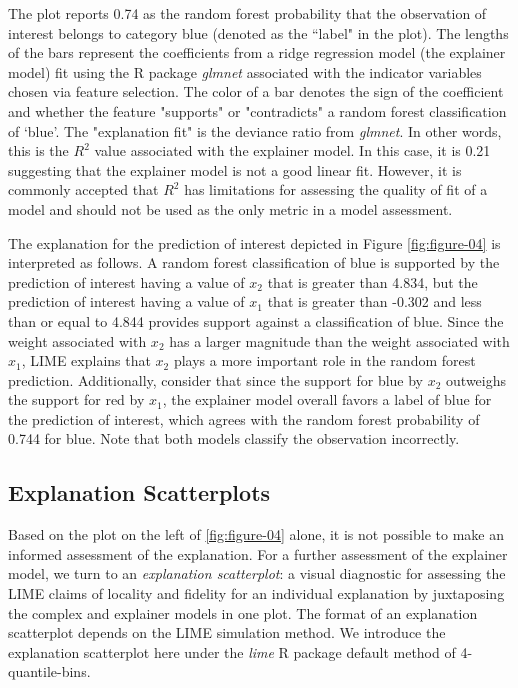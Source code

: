 \documentclass[AMS,STIX2COL]{WileyNJD-v2}\usepackage[]{graphicx}\usepackage[]{color}
\begin{document}
The plot reports 0.74 as  the random forest  probability  that the observation of interest belongs to category blue (denoted as the ``label" in the plot). The lengths of the bars represent the  coefficients from a ridge regression model (the explainer model) fit using the R package \emph{glmnet} \citep{simon:2011} associated with the indicator variables chosen via feature selection. The color of a  bar denotes the sign of the coefficient and whether the feature "supports" or "contradicts" a random forest classification of `blue'. The "explanation fit" is the deviance ratio from  \emph{glmnet}. In other words, this is the $R^2$ value associated with the explainer model. In this case, it is 0.21 suggesting that the explainer model is not a good linear fit. However, it is commonly accepted that $R^2$ has limitations for assessing the quality of fit of a model \citep{sapra:2014} and  should not be used as the only metric in a model assessment.

The explanation for the prediction of interest depicted in Figure \ref{fig:figure-04} is interpreted as follows. A random forest classification of blue is supported by the prediction of interest having a value of $x_2$ that is greater than 4.834, but the prediction of interest having a value of $x_1$ that is greater than -0.302 and less than or equal to 4.844 provides support against a classification of blue. Since the weight associated with $x_2$ has a larger magnitude than the weight associated with $x_1$, LIME explains that $x_2$ plays a more important role in the random forest prediction. Additionally, consider that since the support for blue by $x_2$ outweighs the support for red by $x_1$, the explainer model overall favors a label of blue for the prediction of interest, which agrees with the random forest probability of 0.744 for blue. Note that both models classify the observation incorrectly.

\subsection{Explanation Scatterplots} \label{exp-scatter}

Based on the plot on the left of \autoref{fig:figure-04} alone, it is not possible to make an informed assessment of the explanation. For a further assessment of the explainer model, we turn to an \emph{explanation scatterplot}: a visual diagnostic for assessing the LIME claims of locality and fidelity for an individual explanation by juxtaposing the complex and explainer models in one plot. The format of an explanation scatterplot depends on the LIME simulation method. We introduce the explanation scatterplot here under the \emph{lime} R package default method of 4-quantile-bins.
\end{document}
